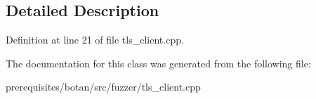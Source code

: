 \subsection{Detailed Description}


Definition at line 21 of file tls\+\_\+client.\+cpp.



The documentation for this class was generated from the following file\+:\begin{DoxyCompactItemize}
\item 
prerequisites/botan/src/fuzzer/tls\+\_\+client.\+cpp\end{DoxyCompactItemize}
